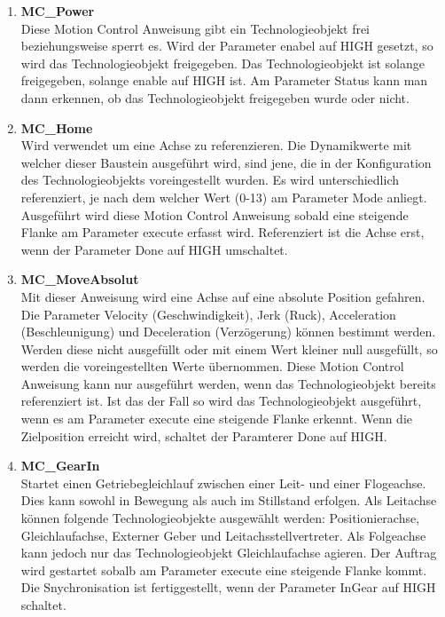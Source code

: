 \begin{enumerate}
    \item \textbf{MC\_Power} \\
        Diese Motion Control Anweisung gibt ein Technologieobjekt frei beziehungsweise sperrt es. Wird der Parameter enabel auf HIGH gesetzt, so wird das Technologieobjekt freigegeben. Das Technologieobjekt ist solange freigegeben, solange enable auf HIGH ist. Am Parameter Status kann man dann erkennen, ob das Technologieobjekt freigegeben wurde oder nicht.

    \item \textbf{MC\_Home} \\
        Wird verwendet um eine Achse zu referenzieren. Die Dynamikwerte mit welcher dieser Baustein ausgeführt wird, sind jene, die in der Konfiguration des Technologieobjekts voreingestellt wurden. Es wird unterschiedlich referenziert, je nach dem welcher Wert (0-13) am Parameter Mode anliegt. Ausgeführt wird diese Motion Control Anweisung sobald eine steigende Flanke am Parameter execute erfasst wird. Referenziert ist die Achse erst, wenn der Parameter Done auf HIGH umschaltet. 

    \item \textbf{MC\_MoveAbsolut} \\
        Mit dieser Anweisung wird eine Achse auf eine absolute Position gefahren. Die Parameter Velocity (Geschwindigkeit), Jerk (Ruck), Acceleration (Beschleunigung) und Deceleration (Verzögerung) können bestimmt werden. Werden diese nicht ausgefüllt oder mit einem Wert kleiner null ausgefüllt, so werden die voreingestellten Werte übernommen. Diese Motion Control Anweisung kann nur ausgeführt werden, wenn das Technologieobjekt bereits referenziert ist. Ist das der Fall so wird das Technologieobjekt ausgeführt, wenn es am Parameter execute eine steigende Flanke erkennt. Wenn die Zielposition erreicht wird, schaltet der Paramterer Done auf HIGH. 

    \item \textbf{MC\_GearIn} \\
        Startet einen Getriebegleichlauf zwischen einer Leit- und einer Flogeachse. Dies kann sowohl in Bewegung als auch im Stillstand erfolgen. Als Leitachse können folgende Technologieobjekte ausgewählt werden: Positionierachse, Gleichlaufachse, Externer Geber und Leitachsstellvertreter. Als Folgeachse kann jedoch nur das Technologieobjekt Gleichlaufachse agieren. Der Auftrag wird gestartet sobalb am Parameter execute eine steigende Flanke kommt. Die Snychronisation ist fertiggestellt, wenn der Parameter InGear auf HIGH schaltet.

\end{enumerate}

